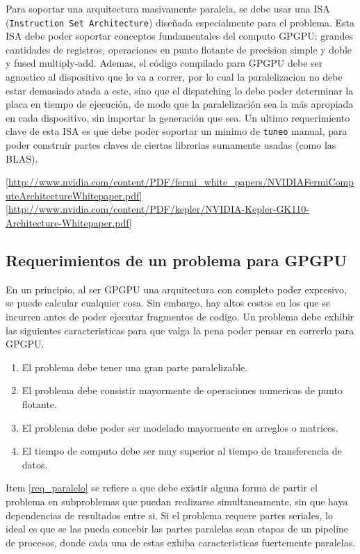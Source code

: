 Para soportar una arquitectura masivamente paralela, se debe usar una ISA
(\texttt{Instruction Set Architecture}) dise\~nada especialmente para el problema. Esta ISA
debe poder soportar conceptos fundamentales del computo GPGPU: grandes cantidades de registros,
operaciones en punto flotante de precision simple y doble y fused multiply-add. Ademas,
el c\'odigo compilado para GPGPU debe ser agnostico al dispositivo que lo va a correr, por
lo cual la paralelizacion no debe estar demasiado atada a este, sino que el dispatching
lo debe poder determinar la placa en tiempo de ejecuci\'on, de modo que la paralelizaci\'on
sea la m\'as apropiada en cada dispositivo, sin importar la generaci\'on que sea. Un ultimo
requerimiento clave de esta ISA es que debe poder soportar un minimo de \texttt{tuneo} manual,
para poder construir partes claves de ciertas librerias sumamente usadas (como las BLAS).

\ref{http://www.nvidia.com/content/PDF/fermi_white_papers/NVIDIAFermiComputeArchitectureWhitepaper.pdf}
\ref{http://www.nvidia.com/content/PDF/kepler/NVIDIA-Kepler-GK110-Architecture-Whitepaper.pdf}

\subsection{Requerimientos de un problema para GPGPU}
En un principio, al ser GPGPU una arquitectura con completo poder expresivo, se puede
calcular cualquier cosa. Sin embargo, hay altos costos en los que se incurren antes de
poder ejecutar fragmentos de codigo. Un problema debe exhibir las siguientes caracteristicas
para que valga la pena poder pensar en correrlo para GPGPU.
\begin{enumerate}
  \item El problema debe tener una gran parte paralelizable.
  \item El problema debe consistir mayormente de operaciones numericas de punto flotante.
  \item El problema debe poder ser modelado mayormente en arreglos o matrices.
  \item El tiempo de computo debe ser muy superior al tiempo de transferencia de datos.
\end{enumerate}

Item \ref{req_paralelo} se refiere a que debe existir alguna forma de partir el problema
en subproblemas que puedan realizarse simultaneamente, sin que haya dependencias de
resultados entre si. Si el problema requere partes seriales, lo ideal es que se las
pueda concebir las partes paralelas sean etapas de un pipeline de procesos, donde
cada una de estas exhiba caracteristicas fuertemente paralelas.

